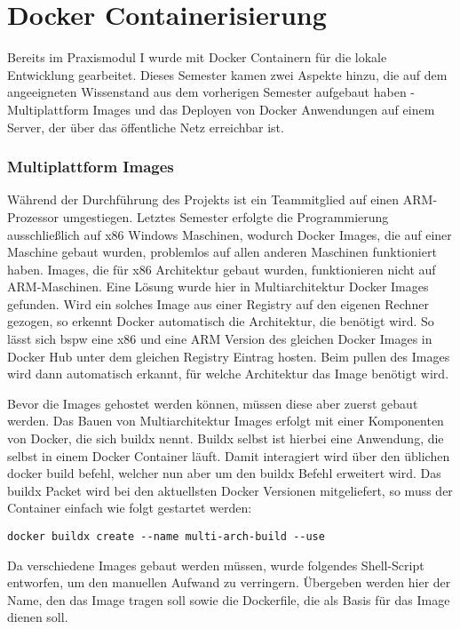 \section{Docker Containerisierung}\label{subsec:docker-containerisierung}

Bereits im Praxismodul I wurde mit Docker Containern für die lokale Entwicklung gearbeitet.
Dieses Semester kamen zwei Aspekte hinzu, die auf dem angeeigneten Wissenstand aus dem vorherigen Semester aufgebaut haben - Multiplattform Images und das Deployen von Docker Anwendungen auf einem Server, der über das öffentliche Netz erreichbar ist.

\subsubsection{Multiplattform Images}\label{subsubsec:multiplattform-images}
Während der Durchführung des Projekts ist ein Teammitglied auf einen ARM-Prozessor umgestiegen.
Letztes Semester erfolgte die Programmierung ausschließlich auf x86 Windows Maschinen, wodurch Docker Images, die auf einer Maschine gebaut wurden, problemlos auf allen anderen Maschinen funktioniert haben.
Images, die für x86 Architektur gebaut wurden, funktionieren nicht auf ARM-Maschinen.
Eine Lösung wurde hier in Multiarchitektur Docker Images gefunden.
Wird ein solches Image aus einer Registry auf den eigenen Rechner gezogen, so erkennt Docker automatisch die Architektur, die benötigt wird.
So lässt sich bspw eine x86 und eine ARM Version des gleichen Docker Images in Docker Hub unter dem gleichen Registry Eintrag hosten.
Beim pullen des Images wird dann automatisch erkannt, für welche Architektur das Image benötigt wird.

Bevor die Images gehostet werden können, müssen diese aber zuerst gebaut werden.
Das Bauen von Multiarchitektur Images erfolgt mit einer Komponenten von Docker, die sich buildx nennt.
Buildx selbst ist hierbei eine Anwendung, die selbst in einem Docker Container läuft.
Damit interagiert wird über den üblichen docker build befehl, welcher nun aber um den buildx Befehl erweitert wird.
Das buildx Packet wird bei den aktuellsten Docker Versionen mitgeliefert, so muss der Container einfach wie folgt gestartet werden:

\lstset{language=Shell}
\begin{lstlisting}[label={lst:lst-shell-buildx-setup}]
docker buildx create --name multi-arch-build --use
\end{lstlisting}

Da verschiedene Images gebaut werden müssen, wurde folgendes Shell-Script entworfen, um den manuellen Aufwand zu verringern.
Übergeben werden hier der Name, den das Image tragen soll sowie die Dockerfile, die als Basis für das Image dienen soll.

